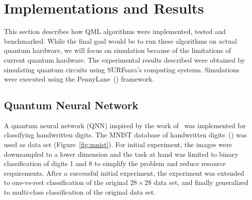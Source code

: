 \documentclass[a4paper,10pt]{article}
\begin{document}
\section{Implementations and Results} \label{sec:implementation-and-results}
This section describes how QML algorithms were implemented, tested and benchmarked.
While the final goal would be to run these algorithms on actual quantum hardware, we will focus on simulation because of the limitations of current quantum hardware.
The experimental results described were obtained by simulating quantum circuits using SURFsara's computing systems.
Simulations were executed using the PennyLane~(\cite{bergholm2018pennylane}) framework.

\subsection{Quantum Neural Network}
A quantum neural network (QNN) inspired by the work of~\cite{qnn-near-term} was implemented for classifying handwritten digits.
The MNIST database of handwritten digits~(\cite{mnist-digits}) was used as data set (Figure~\ref{fig:mnist}).
For initial experiment, the images were downsampled to a lower dimension and the task at hand was limited to binary classification of digits 1 and 8 to simplify the problem and reduce resource requirements.
After a successful initial experiment, the experiment was extended to one-vs-rest classification of the original $28 \times 28$ data set, and finally generalized to multi-class classification of the original data set.
\end{document}
